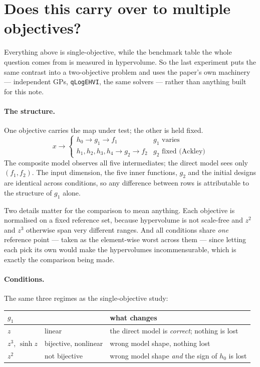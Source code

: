 \section{Does this carry over to multiple objectives?}
\label{sec:mobo}

Everything above is single-objective, while the benchmark table the whole
question comes from is measured in hypervolume. So the last experiment puts
the same contrast into a two-objective problem and uses the paper's own
machinery --- independent GPs, \texttt{qLogEHVI}, the same solvers --- rather
than anything built for this note.

\paragraph{The structure.} One objective carries the map under test; the other
is held fixed.
\[
x \longrightarrow
\begin{cases}
h_0 \longrightarrow g_1 \longrightarrow f_1 & \text{$g_1$ varies} \\
h_1,h_2,h_3,h_4 \longrightarrow g_2 \longrightarrow f_2 & \text{$g_2$ fixed (Ackley)}
\end{cases}
\]
The composite model observes all five intermediates; the direct model sees only
$(f_1,f_2)$. The input dimension, the five inner functions, $g_2$ and the
initial designs are identical across conditions, so any difference between rows
is attributable to the structure of $g_1$ alone.

Two details matter for the comparison to mean anything. Each objective is
normalised on a fixed reference set, because hypervolume is not scale-free and
$z^2$ and $z^3$ otherwise span very different ranges. And all conditions share
\emph{one} reference point --- taken as the element-wise worst across them ---
since letting each pick its own would make the hypervolumes incommensurable,
which is exactly the comparison being made.

\paragraph{Conditions.} The same three regimes as the single-objective study:

\begin{center}
\begin{tabular}{lll}
\toprule
$g_1$ & & what changes \\
\midrule
$z$   & linear & the direct model is \emph{correct}; nothing is lost \\
$z^3$, $\sinh z$ & bijective, nonlinear & wrong model shape, nothing lost \\
$z^2$ & not bijective & wrong model shape \emph{and} the sign of $h_0$ is lost \\
\bottomrule
\end{tabular}
\end{center}

